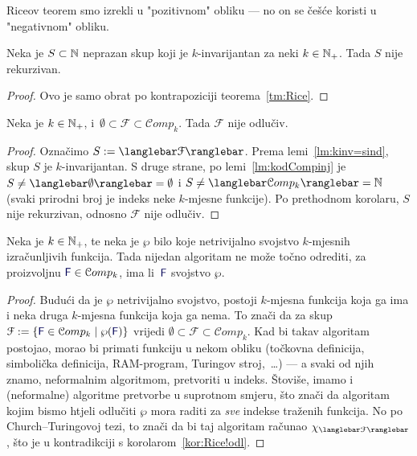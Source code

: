 Riceov teorem smo izrekli u "pozitivnom" obliku --- no on se češće koristi u "negativnom" obliku.

\begin{korolar}
Neka je $S\subset{\mathbb N}$ neprazan skup koji je $k$-invarijantan za neki $k\in{\mathbb N}_+$. Tada $S$ nije rekurzivan.
\end{korolar}
\begin{proof}
Ovo je samo obrat po kontrapoziciji teorema~\ref{tm:Rice}.
\end{proof}

\begin{korolar}\label{kor:Rice!odl}
Neka je $k\in{\mathbb N}_+$, i \,$\emptyset\subset\mathcal F\subset\mathcal Comp_k$. Tada $\mathcal F$ nije odlučiv.
\end{korolar}
\begin{proof}
Označimo $S:=\knk{\mathcal F}$. Prema lemi~\ref{lm:kinv=sind}, skup $S$ je $k$-invarijantan. S druge strane, po lemi~\ref{lm:kodCompinj} je $S\not=\knk{\emptyset}=\emptyset$ i $S\not=\knk{\mathcal Comp_k}=\N$ (svaki prirodni broj je indeks neke $k$-mjesne funkcije). Po prethodnom korolaru, $S$ nije rekurzivan, odnosno $\mathcal F$ nije odlučiv.
\end{proof}

\begin{korolar}
Neka je $k\in{\mathbb N}_+$, te neka je $\wp$ bilo koje netrivijalno svojstvo $k$-mjesnih izračunljivih funkcija. Tada nijedan algoritam ne može točno odrediti, za proizvoljnu $\f F\in\mathcal Comp_k$, ima li\, $\f F$ svojstvo $\wp$.
\end{korolar}
\begin{proof}
Budući da je $\wp$ netrivijalno svojstvo, postoji $k$-mjesna funkcija koja ga ima i neka druga $k$-mjesna funkcija koja ga nema. To znači da za skup $\mathcal F:=\{\f F\in\mathcal Comp_k\mid\wp(\f F)\}$ vrijedi $\emptyset\subset\mathcal F\subset\mathcal Comp_k$. Kad bi takav algoritam postojao, morao bi primati funkciju u nekom obliku (točkovna definicija, simbolička definicija, RAM-program, Turingov stroj,~\ldots) --- a svaki od njih znamo, neformalnim algoritmom, pretvoriti u indeks. Štoviše, imamo i (neformalne) algoritme pretvorbe u suprotnom smjeru, što znači da algoritam kojim bismo htjeli odlučiti $\wp$ mora raditi za \emph{sve} indekse traženih funkcija.
No po Church--\!Turingovoj tezi, to znači da bi taj algoritam računao $\chi_{\knk{\mathcal F}}$, što je u kontradikciji s korolarom~\ref{kor:Rice!odl}.
\end{proof}

